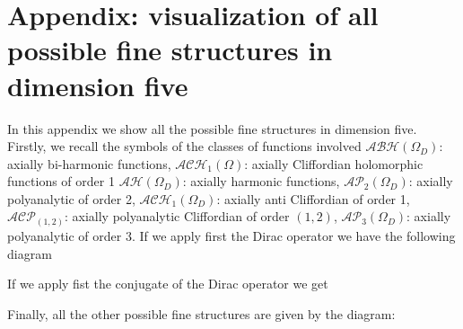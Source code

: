 \documentclass[reqno,11pt]{amsart}
\numberwithin{equation}{section}
\theoremstyle{definition}
\begin{document}
\section{Appendix: visualization of all possible fine structures in dimension five}

In this appendix we show all the possible fine structures in dimension five. Firstly, we recall the symbols of the classes of functions involved
\newline
\newline
$ \mathcal{ABH}(\Omega_D)$: axially bi-harmonic functions,
\newline
$ \mathcal{ACH}_1(\Omega)$: axially Cliffordian holomorphic functions of order 1
\newline
$ \mathcal{AH}(\Omega_D)$: axially harmonic functions,
\newline
$ \mathcal{AP}_2(\Omega_{D})$: axially polyanalytic of order 2,
\newline
$ \mathcal{ACH}_1(\Omega_D)$: axially anti Cliffordian of order 1,
\newline
$ \mathcal{ACP}_{(1,2)}$: axially polyanalytic Cliffordian of order $(1,2)$,
\newline
$ \mathcal{AP}_3(\Omega_{D})$: axially polyanalytic of order 3.
\newline
\newline
If we apply first the Dirac operator we have the following diagram
\begin{figure}[H]
\centering
\resizebox{0.95\textwidth}{!}{%

}
\end{figure}
If we apply fist the conjugate of the Dirac operator we get
\begin{figure}[H]
\centering
\resizebox{0.95\textwidth}{!}{%

}
\end{figure}



Finally, all the other possible fine structures are given by the diagram:
\begin{figure}[H]
\centering
\resizebox{0.95\textwidth}{!}{%

}
\end{figure}
\end{document}
